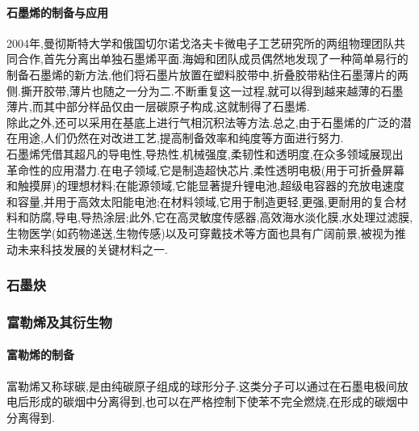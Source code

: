\documentclass{ctexart}
\begin{document}
\paragraph{石墨烯的制备与应用}
2004年,曼彻斯特大学和俄国切尔诺戈洛夫卡微电子工艺研究所的两组物理团队共同合作,首先分离出单独石墨烯平面.海姆和团队成员偶然地发现了一种简单易行的制备石墨烯的新方法,他们将石墨片放置在塑料胶带中,折叠胶带粘住石墨薄片的两侧.撕开胶带,薄片也随之一分为二.不断重复这一过程,就可以得到越来越薄的石墨薄片,而其中部分样品仅由一层碳原子构成,这就制得了石墨烯.\\
\indent 除此之外,还可以采用在基底上进行气相沉积法等方法.总之,由于石墨烯的广泛的潜在用途,人们仍然在对改进工艺,提高制备效率和纯度等方面进行努力.\\
\indent 石墨烯凭借其超凡的导电性,导热性,机械强度,柔韧性和透明度,在众多领域展现出革命性的应用潜力.在电子领域,它是制造超快芯片,柔性透明电极(用于可折叠屏幕和触摸屏)的理想材料;在能源领域,它能显著提升锂电池,超级电容器的充放电速度和容量,并用于高效太阳能电池;在材料领域,它用于制造更轻,更强,更耐用的复合材料和防腐,导电,导热涂层;此外,它在高灵敏度传感器,高效海水淡化膜,水处理过滤膜,生物医学(如药物递送,生物传感)以及可穿戴技术等方面也具有广阔前景,被视为推动未来科技发展的关键材料之一.
\subsubsection{石墨炔}
\subsubsection{富勒烯及其衍生物}
\paragraph{富勒烯的制备}
富勒烯又称球碳,是由纯碳原子组成的球形分子.这类分子可以通过在石墨电极间放电后形成的碳烟中分离得到,也可以在严格控制下使苯不完全燃烧,在形成的碳烟中分离得到.
\end{document}
